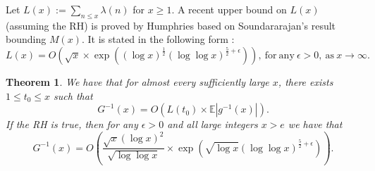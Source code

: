 \documentclass[11pt,reqno,a4letter]{article}
\numberwithin{figure}{section}
\numberwithin{table}{section}
\theoremstyle{plain}
\newtheorem{theorem}{Theorem}
\numberwithin{theorem}{section}
\theoremstyle{definition}
\begin{document}
Let $L(x) := \sum_{n \leq x} \lambda(n)$ for $x \geq 1$. 
A recent upper bound on $L(x)$ (assuming the RH) is proved by 
Humphries based on Soundararajan's result bounding $M(x)$. It is 
stated in the following form \cite{HUMPHRIES-JNT-2013}: 
\begin{equation} 
\label{eqn_LxBigOhAsymptotics_Humphries_v1}
L(x) = O\left(\sqrt{x} \times \exp\left( (\log x)^{\frac{1}{2}} 
     (\log\log x)^{\frac{5}{2} + \epsilon}\right)\right), 
     \mathrm{\ for\ any\ } \epsilon > 0, 
     \mathrm{\ as\ } x \rightarrow \infty.
\end{equation}

\begin{theorem} 
\label{cor_ExprForGInvxByLx_v1} 
We have that for almost every sufficiently large $x$, there exists $1 \leq t_0 \leq x$ such that 
$$G^{-1}(x) = O\left(L(t_0) \times \mathbb{E}|g^{-1}(x)|\right).$$ 
If the RH is true, then 
for any $\epsilon > 0$ and all large integers $x > e$ we have that 
\[
G^{-1}(x) = O\left(\frac{\sqrt{x} (\log x)^2}{\sqrt{\log\log x}} \times \exp\left( 
     \sqrt{\log x} (\log\log x)^{\frac{5}{2} + \epsilon}\right)\right). 
\]
\end{theorem} 
\end{document}
